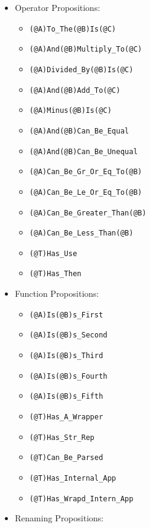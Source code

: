 \documentclass{article}
\begin{document}
\begin{itemize}

\item Operator Propositions:

  \begin{itemize}
  \item \texttt{(@A)To_The(@B)Is(@C)}
  \item \texttt{(@A)And(@B)Multiply_To(@C)}
  \item \texttt{(@A)Divided_By(@B)Is(@C)}
  \item \texttt{(@A)And(@B)Add_To(@C)}
  \item \texttt{(@A)Minus(@B)Is(@C)}
  \item \texttt{(@A)And(@B)Can_Be_Equal}
  \item \texttt{(@A)And(@B)Can_Be_Unequal}
  \item \texttt{(@A)Can_Be_Gr_Or_Eq_To(@B)}
  \item \texttt{(@A)Can_Be_Le_Or_Eq_To(@B)}
  \item \texttt{(@A)Can_Be_Greater_Than(@B)}
  \item \texttt{(@A)Can_Be_Less_Than(@B)}
  \item \texttt{(@T)Has_Use}
  \item \texttt{(@T)Has_Then}
  \end{itemize}

\item Function Propositions:

  \begin{itemize}
  \item \texttt{(@A)Is(@B)s_First}
  \item \texttt{(@A)Is(@B)s_Second}
  \item \texttt{(@A)Is(@B)s_Third}
  \item \texttt{(@A)Is(@B)s_Fourth}
  \item \texttt{(@A)Is(@B)s_Fifth}
  \item \texttt{(@T)Has_A_Wrapper}
  \item \texttt{(@T)Has_Str_Rep}
  \item \texttt{(@T)Can_Be_Parsed}
  \item \texttt{(@T)Has_Internal_App}
  \item \texttt{(@T)Has_Wrapd_Intern_App}
  \end{itemize}

\item Renaming Propositions:


\end{itemize}
\end{document}
